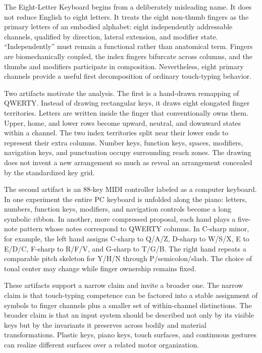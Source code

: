 \documentclass[11pt]{article}
\begin{document}
The Eight-Letter Keyboard begins from a deliberately misleading name. It does not reduce English to eight letters. It treats the eight non-thumb fingers as the primary letters of an embodied alphabet: eight independently addressable channels, qualified by direction, lateral extension, and modifier state. ``Independently'' must remain a functional rather than anatomical term. Fingers are biomechanically coupled, the index fingers bifurcate across columns, and the thumbs and modifiers participate in composition. Nevertheless, eight primary channels provide a useful first decomposition of ordinary touch-typing behavior.

Two artifacts motivate the analysis. The first is a hand-drawn remapping of QWERTY. Instead of drawing rectangular keys, it draws eight elongated finger territories. Letters are written inside the finger that conventionally owns them. Upper, home, and lower rows become upward, neutral, and downward states within a channel. The two index territories split near their lower ends to represent their extra columns. Number keys, function keys, spaces, modifiers, navigation keys, and punctuation occupy surrounding reach zones. The drawing does not invent a new arrangement so much as reveal an arrangement concealed by the standardized key grid.

The second artifact is an 88-key MIDI controller labeled as a computer keyboard. In one experiment the entire PC keyboard is unfolded along the piano: letters, numbers, function keys, modifiers, and navigation controls become a long symbolic ribbon. In another, more compressed proposal, each hand plays a five-note pattern whose notes correspond to QWERTY columns. In C-sharp minor, for example, the left hand assigns C-sharp to Q/A/Z, D-sharp to W/S/X, E to E/D/C, F-sharp to R/F/V, and G-sharp to T/G/B. The right hand repeats a comparable pitch skeleton for Y/H/N through P/semicolon/slash. The choice of tonal center may change while finger ownership remains fixed.

These artifacts support a narrow claim and invite a broader one. The narrow claim is that touch-typing competence can be factored into a stable assignment of symbols to finger channels plus a smaller set of within-channel distinctions. The broader claim is that an input system should be described not only by its visible keys but by the invariants it preserves across bodily and material transformations. Plastic keys, piano keys, touch surfaces, and continuous gestures can realize different surfaces over a related motor organization.
\end{document}
